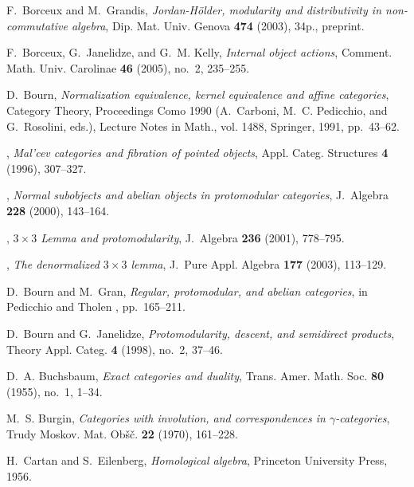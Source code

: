 \documentclass [12pt,oneside]{book}%
\theoremstyle{captionstyle}  %
\begin{document}
\begin{thebibliography}{10}
    F.~Borceux and M.~Grandis, \emph{{J}ordan-{H\"o}lder, modularity and
    distributivity in non-commutative algebra}, Dip. Mat. Univ. Genova
    \textbf{474} (2003), 34p., preprint.

    F.~Borceux, G.~Janelidze, and G.~M. Kelly, \emph{Internal object actions},
    Comment. Math. Univ. Carolinae \textbf{46} (2005), no.~2, 235--255.

    D.~Bourn, \emph{Normalization equivalence, kernel equivalence and affine
        categories}, Category {T}heory, {P}roceedings {C}omo 1990 (A.~Carboni, M.~C.
    Pedicchio, and G.~Rosolini, eds.), Lecture Notes in Math., vol. 1488,
    Springer, 1991, pp.~43--62.

    \bysame, \emph{Mal'cev categories and fibration of pointed objects}, Appl.
    Categ. Structures \textbf{4} (1996), 307--327.

    \bysame, \emph{Normal subobjects and abelian objects in protomodular
        categories}, J.~Algebra \textbf{228} (2000), 143--164.

    \bysame, \emph{{$3\times 3$} {L}emma and protomodularity}, J.~Algebra
    \textbf{236} (2001), 778--795.

    \bysame, \emph{The denormalized {$3\times 3$} lemma}, J.~Pure Appl. Algebra
    \textbf{177} (2003), 113--129.

    D.~Bourn and M.~Gran, \emph{Regular, protomodular, and abelian categories}, in
    Pedicchio and Tholen \cite{CategoricalFoundations}, pp.~165--211.

    D.~Bourn and G.~Janelidze, \emph{Protomodularity, descent, and semidirect
        products}, Theory Appl. Categ. \textbf{4} (1998), no.~2, 37--46.

    D.~A. Buchsbaum, \emph{Exact categories and duality}, Trans. Amer. Math. Soc.
    \textbf{80} (1955), no.~1, 1--34.

    M.~S. Burgin, \emph{Categories with involution, and correspondences in {$\gamma
                $}-categories}, Trudy Moskov. Mat. Ob\v{s}\v{c}. \textbf{22} (1970),
    161--228.

    H.~Cartan and S.~Eilenberg, \emph{Homological algebra}, Princeton University
    Press, 1956.


\end{thebibliography}
\end{document}
